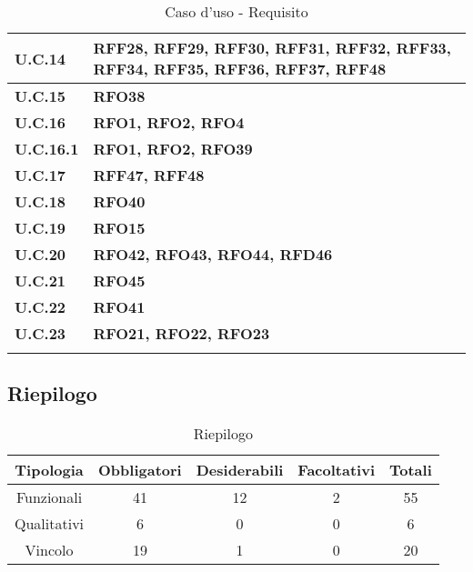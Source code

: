 \begin{longtable}{|>{\centering\arraybackslash}m{}|>{\centering\arraybackslash}m{}|}
	\textbf{U.C.14} & \textbf{RFF28, RFF29, RFF30, RFF31, RFF32, RFF33, RFF34, RFF35, RFF36, RFF37, RFF48} \\\hline
	\textbf{U.C.15} & \textbf{RFO38} \\\hline
	\textbf{U.C.16} & \textbf{RFO1, RFO2, RFO4} \\\hline
	\textbf{U.C.16.1} & \textbf{RFO1, RFO2, RFO39} \\\hline
	\textbf{U.C.17} & \textbf{RFF47, RFF48} \\\hline
	\textbf{U.C.18} & \textbf{RFO40} \\\hline
	\textbf{U.C.19} & \textbf{RFO15} \\\hline
	\textbf{U.C.20} & \textbf{RFO42, RFO43, RFO44, RFD46} \\\hline
	\textbf{U.C.21} & \textbf{RFO45} \\\hline
	\textbf{U.C.22} & \textbf{RFO41} \\\hline
	\textbf{U.C.23} & \textbf{RFO21, RFO22, RFO23} \\\hline
	\caption{Caso d'uso - Requisito}
\end{longtable}
\newpage
\subsection{Riepilogo}
\begin{table}[h]
    \centering
    \renewcommand{\arraystretch}{1.2}
    \setlength{\tabcolsep}{5pt}
    \begin{tabular}{|c|c|c|c|c|}
		\hline
		\textbf{Tipologia} & \textbf{Obbligatori} & \textbf{Desiderabili} & \textbf{Facoltativi} & \textbf{Totali} \\
		\hline
		Funzionali & 41 & 12 & 2 & 55 \\
		\hline
		Qualitativi & 6 & 0 & 0 & 6 \\
		\hline
		Vincolo & 19 & 1 & 0 & 20 \\
		\hline
    \end{tabular}
	\caption{Riepilogo}
\end{table}